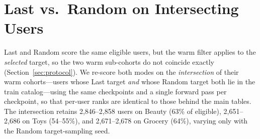 \documentclass[sigconf,natbib=true,anonymous]{acmart}
\begin{document}
\section{Last vs.\ Random on Intersecting Users}
\label{app:intersection}

Last and Random score the same eligible users, but the warm filter applies to the \emph{selected} target, so the two warm sub-cohorts do not coincide exactly (Section~\ref{sec:protocol}).
We re-score both modes on the \emph{intersection} of their warm cohorts---users whose Last target \emph{and} whose Random target both lie in the train catalog---using the same checkpoints and a single forward pass per checkpoint, so that per-user ranks are identical to those behind the main tables.
The intersection retains 2{,}846--2{,}858 users on Beauty (63\% of eligible), 2{,}651--2{,}686 on Toys (54--55\%), and 2{,}671--2{,}678 on Grocery (64\%), varying only with the Random target-sampling seed.
\end{document}
